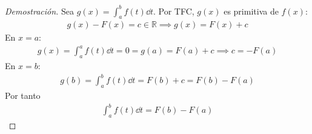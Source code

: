 \documentclass{article}
\begin{document}
\begin{proof}[Demostración]
    Sea $g(x)= \int _{a}^{b} f(t) \dd{t}$. Por TFC, $g(x)$ es primitiva de $f(x)$:
    \begin{equation}
        \begin{split}
            g(x)-F(x) = c \in \mathbb{R} \implies g(x)= F(x)+c
        \end{split}
    \end{equation}
    En $x=a$:
    \begin{equation}
        \begin{split}
            g(x) = \int _{a}^{a}f(t) \dd{t}=0=g(a)= F(a)+c \implies c = -F(a)
        \end{split}
    \end{equation}
    En $x=b$:
    \begin{equation}
        \begin{split}
            g(b) = \int _{a}^{b}f(t) \dd{t}= F(b)+c = F(b)-F(a)
        \end{split}
    \end{equation}
    Por tanto
    \begin{equation}
        \begin{split}
            \int _{a}^{b} f(t) \dd{t} = F(b)-F(a)
        \end{split}
    \end{equation}
\end{proof}
\end{document}
